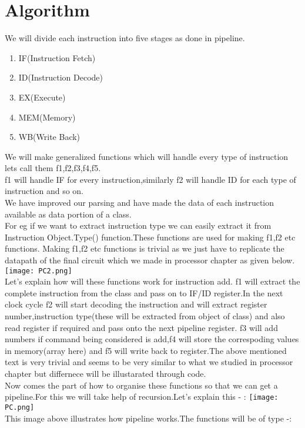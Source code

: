 \documentclass[12pt]{extarticle}
\begin{document}
\section{Algorithm}
We will divide each instruction into five stages as done in pipeline.
\begin{enumerate}
\item IF(Instruction Fetch)
\item ID(Instruction Decode)
\item EX(Execute)
\item MEM(Memory)
\item WB(Write Back)
\end{enumerate}
We will make generalized functions which will handle every type of instruction lets call them f1,f2,f3,f4,f5.\\
f1 will handle IF for every instruction,similarly f2 will handle ID for each type of instruction and so on.\\
We have improved our parsing and have made the data of each instruction available as data portion of a class.\\
For eg if we want to extract instruction type we can easily extract it from {Instruction Object}.Type() function.These functions are used for making f1,f2 etc functions. Making f1,f2 etc functions is trivial as we just have to replicate the datapath of the final circuit which we made in processor chapter as given below.\\
\texttt{[image: PC2.png]}
\\
Let's explain how will these functions work for instruction add.
f1 will extract the complete instruction from the class and pass on to IF/ID register.In the next clock cycle f2 will start decoding the instruction and will extract register number,instruction type(these will be extracted from object of class) and also read register if required and pass onto the next pipeline register.
f3 will add numbers if command being considered is add,f4 will store the correspoding values in memory(array here) and f5 will write back to register.The above mentioned text is very trivial and seems to be very similar to what we studied in processor chapter but differnece will be illustarated through code.
\\
Now comes the part of how to organise these functions so that we can get a pipeline.For this we will take help of recursion.Let's explain this - :
\texttt{[image: PC.png]}
\\
This image above illustrates how pipeline works.The functions will be of type -:
\end{document}
